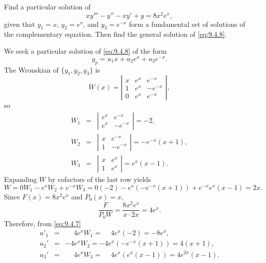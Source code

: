 \begin{example}
  \label{example:9.4.1} \rm Find a particular solution of
  \begin{equation}
    \label{eq:9.4.8}xy'''-y''-xy'+y=8x^{2}e^{x},
  \end{equation}
  given that $y_{1}=x$, $y_{2}=e^{x}$, and $y_{3}=e^{-x}$ form a fundamental set of solutions of the
  complementary equation. Then find the general solution of \eqref{eq:9.4.8}.
\end{example}

\begin{examplesolution}
\solution We seek a particular solution of \eqref{eq:9.4.8} of the form
\[
  y_{p}=u_{1}x+u_{2}e^{x}+u_{3}e^{-x}.
\]
The Wronskian of $\{y_{1},y_{2},y_{3}\}$ is
\[
  W(x)=\left|
  \begin{array}{ccr}
    x & e^{x} & e^{-x}  \\
    1 & e^{x} & -e^{-x} \\
    0 & e^{x} & e^{-x}
  \end{array}\right|,
\]
so
\begin{eqnarray*}
  W_{1}&=& \left|
  \begin{array}{cr}
    e^{x} & e^{-x}  \\
    e^{x} & -e^{-x}
  \end{array}\right|=-2,\\[10pt] W_{2}&=& \left|
  \begin{array}{cr}
    x & e^{-x}  \\
    1 & -e^{-x}
  \end{array}\right|=-e^{-x}(x+1),\\ W_{3}&=& \left|
  \begin{array}{cc}
    x & e^{x} \\
    1 & e^{x}
  \end{array}\right|=e^{x}(x-1).
\end{eqnarray*}
Expanding $W$ by cofactors of the last row yields
\[
  W=0W_{1}-e^{x}W_{2}+e^{-x}W_{3}=0(-2)-e^{x}\left(-e^{-x}(x+1)\right) +e^{-x}e^{x}(x-1)=2x.
\]
Since $F(x)=8x^{2}e^{x}$ and $P_{0}(x)=x$,
\[
  \frac{F}{P_{0}W}=\frac{8x^{2}e^{x}}{x\cdot2x}=4e^{x}.
\]
Therefore, from \eqref{eq:9.4.7}
\begin{eqnarray*}
  u'_{1} & = & \phantom{-}4e^{x}W_{1}=\phantom{-}4e^{x}(-2)=-8e^{x}, \\
  u_{2}' & = & -4e^{x}W_{2}=-4e^{x}\left(-e^{-x}(x+1)\right)=4(x+1), \\
  u_{3}' & = & \phantom{-}4e^{x}W_{3}=\phantom{-}4e^{x}\left(e^{x}(x-1)\right)=4e^{2x}(x-1).

\end{eqnarray*}
\end{examplesolution}
